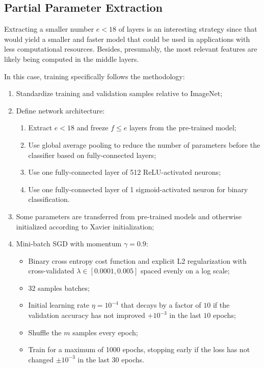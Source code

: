 \subsection{Partial Parameter Extraction}
\label{section:partial_parameter_extraction}

Extracting a smaller number $e < 18$ of layers is an interesting strategy since that would yield a smaller and faster model that could be used in applications with less computational resources. Besides, presumably, the most relevant features are likely being computed in the middle layers.

In this case, training specifically follows the methodology:

\begin{enumerate}
    \item Standardize training and validation samples relative to ImageNet;
    \item Define network architecture:
        \begin{enumerate}
            \item Extract $e < 18$ and freeze $f \leq e$ layers from the pre-trained model;
            \item Use global average pooling to reduce the number of parameters before the classifier based on fully-connected layers;
            \item Use one fully-connected layer of 512 ReLU-activated neurons;
            \item Use one fully-connected layer of 1 sigmoid-activated neuron for binary classification.
        \end{enumerate}
    \item Some parameters are transferred from pre-trained models and otherwise initialized according to Xavier \cite{xavierinit} initialization;
    \item Mini-batch \ac{SGD} with momentum $\gamma = 0.9$:
        \begin{itemize}
            \item Binary cross entropy cost function and explicit L2 regularization with cross-validated $\lambda \in [0.0001, 0.005]$ spaced evenly on a log scale;
            \item 32 samples batches;
            \item Initial learning rate $\eta = 10^{-4}$ that decays by a factor of $10$ if the validation accuracy has not improved $+10^{-3}$ in the last $10$ epochs;
            \item Shuffle the $m$ samples every epoch;
            \item Train for a maximum of 1000 epochs, stopping early if the loss has not changed $\pm 10^{-3}$ in the last $30$ epochs.
        \end{itemize}
\end{enumerate}

